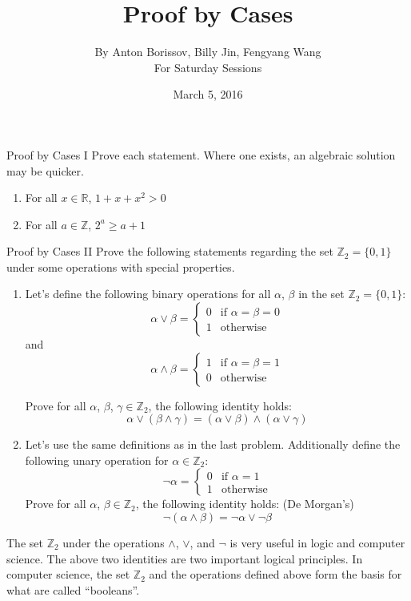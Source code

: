 \documentclass[12pt,letterpaper]{article}
\title{Proof by Cases}
\author{By Anton Borissov, Billy Jin, Fengyang Wang\\
For Saturday Sessions}
\date{March 5, 2016}
\begin{document}
\maketitle

\thispagestyle{empty}

\begin{problem}{Proof by Cases I}
 Prove each statement. Where one exists, an algebraic solution may be quicker.

 \begin{enumerate}[\hspace{.5cm}a.]
  \item For all $x\in\mathbb{R}$, $1 + x + x^2 > 0$
  \item For all $a\in\mathbb{Z}$, $2^a \ge a + 1$
 \end{enumerate}
\end{problem}

\begin{problem}{Proof by Cases II}
 Prove the following statements regarding the set $\mathbb{Z}_2=\{0, 1\}$ under
 some operations with special properties.

 \begin{enumerate}[\hspace{.5cm}a.]
  \item Let's define the following binary operations for all $\alpha$, $\beta$
  in the set $\mathbb{Z}_2=\{0, 1\}$: \[
    \alpha \lor \beta = \begin{cases}
     0 & \text{if }\alpha=\beta=0 \\
     1 & \text{otherwise}
    \end{cases}
   \] and \[
    \alpha \land \beta = \begin{cases}
     1 & \text{if }\alpha=\beta=1 \\
     0 & \text{otherwise}
    \end{cases}
   \]

   Prove for all $\alpha$, $\beta$, $\gamma\in\mathbb{Z}_2$, the following
   identity holds: \[
    \alpha \lor \left(\beta \land \gamma\right) = \left( \alpha \lor \beta
    \right) \land \left( \alpha \lor \gamma \right)
   \]
  \item Let's use the same definitions as in the last problem. Additionally
  define the following unary operation for $\alpha\in\mathbb{Z}_2$: \[
   \lnot\alpha = \begin{cases}
    0 & \text{if }\alpha=1 \\
    1 & \text{otherwise}
   \end{cases}
  \]
  Prove for all $\alpha$, $\beta\in\mathbb{Z}_2$, the following
  identity holds: \hfill (De Morgan's) \[
   \lnot \left(\alpha \land \beta\right) = \lnot\alpha \lor \lnot\beta
  \]
 \end{enumerate}

 The set $\mathbb{Z}_2$ under the operations $\land$, $\lor$, and $\lnot$ is very useful in
 logic and computer science. The above two identities are two important logical principles.
 In computer science, the set $\mathbb{Z}_2$ and the operations defined above form the basis
 for what are called ``booleans''.
\end{problem}
\end{document}
